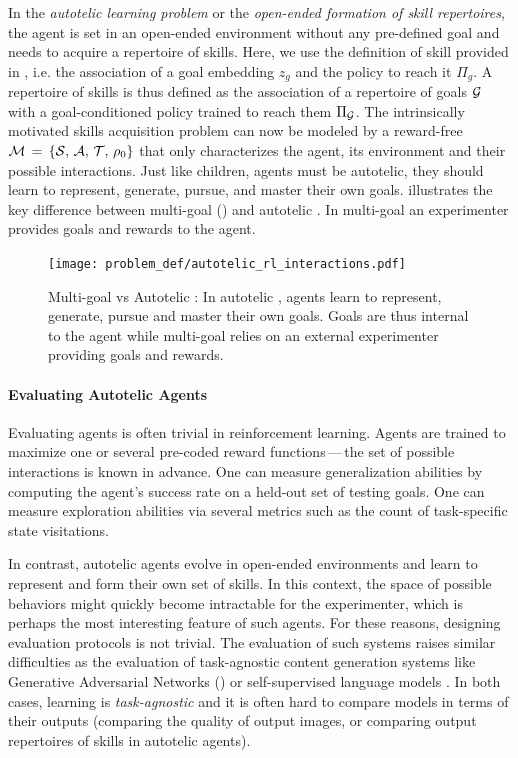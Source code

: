 In the \textit{autotelic learning problem} or the \textit{open-ended formation of skill repertoires}, the agent is set in an open-ended environment without any pre-defined goal and needs to acquire a repertoire of skills. Here, we use the definition of skill provided in , i.e. the association of a goal embedding $z_g$ and the policy to reach it $\Pi_g$. A repertoire of skills is thus defined as the association of a repertoire of goals $\mathcal{G}$ with a goal-conditioned policy trained to reach them $\Pi_{\mathcal{G}}$. The intrinsically motivated skills acquisition problem can now be modeled by a reward-free \mdp $\mathcal{M}\,=\,\{\mathcal{S},\, \mathcal{A},\, \mathcal{T},\, \rho_0\}$ that only characterizes the agent, its environment and their possible interactions. Just like children, agents must be autotelic, \ie they should learn to represent, generate, pursue, and master their own goals.  illustrates the key difference between multi-goal \rl () and autotelic \rl. In multi-goal \rl an experimenter provides goals and rewards to the agent. 
%
\begin{figure}[!h]
\centering
\texttt{[image: problem\_def/autotelic\_rl\_interactions.pdf]}
\caption{Multi-goal \rl vs Autotelic \rl: In autotelic \rl, agents learn to represent, generate, pursue and master their own goals. Goals are thus internal to the agent while multi-goal \rl relies on an external experimenter providing goals and rewards.}
\label{fig:rl_vs_autotelic}
\end{figure}

\paragraph{Evaluating Autotelic Agents}

Evaluating agents is often trivial in reinforcement learning. Agents are trained to maximize one or several pre-coded reward functions\,---\,the set of possible interactions is known in advance. One can measure generalization abilities by computing the agent's success rate on a held-out set of testing goals. One can measure exploration abilities via several metrics such as the count of task-specific state visitations.

In contrast, autotelic agents evolve in open-ended environments and learn to represent and form their own set of skills. In this context, the space of possible behaviors might quickly become intractable for the experimenter, which is perhaps the most interesting feature of such agents. For these reasons, designing evaluation protocols is not trivial. The evaluation of such systems raises similar difficulties as the evaluation of task-agnostic content generation systems like Generative Adversarial Networks (\gan) \citep{goodfellow2014generative} or self-supervised language models \citep{devlin2019bert,brown2020language}. In both cases, learning is \textit{task-agnostic} and it is often hard to compare models in terms of their outputs (\eg comparing the quality of \gan output images, or comparing output repertoires of skills in autotelic agents).


